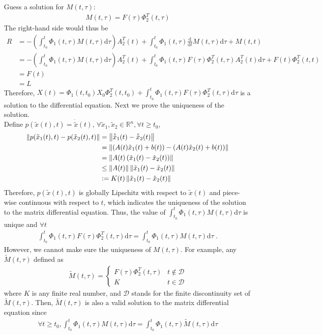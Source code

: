 \documentclass[a4paper,10.5pt]{article}
\newcommand{\de}{\mathrm{d}}
\newcommand{\R}{\mathbb{R}}
\newcommand{\defeq}{\vcentcolon=}
\newcommand{\norm}[1]{\left\lVert#1\right\rVert}
\begin{document}
Guess a solution for $M(t,\tau)$:
\begin{align*}
M(t,\tau) = F(\tau)\Phi_2^T(t,\tau)
\end{align*}
The right-hand side would thus be
\begin{align*}
R &= -\left( \int_{t_0}^{t}\Phi_1(t,\tau)M(t,\tau)\de\tau \right) A_2^T(t)+\int_{t_0}^t \Phi_1(t,\tau)\frac{\de}{\de t}M(t,\tau)\de \tau + M(t,t) \\
&= -\left( \int_{t_0}^{t}\Phi_1(t,\tau)M(t,\tau)\de\tau \right) A_2^T(t)+\int_{t_0}^t \Phi_1(t,\tau)F(\tau)\Phi_2^T(t,\tau)A_2^T(t)\de \tau + F(t)\Phi_2^T(t,t) \\
&= F(t) \\
&= L
\end{align*}
Therefore, $X(t) = \Phi_1(t,t_0) X_0 \Phi^T_2(t,t_0) + \int_{t_0}^{t}\Phi_1(t,\tau)F(\tau)\Phi_2^T(t,\tau)\mathrm{d}\tau$ is a solution to the differential equation. Next we prove the uniqueness of the solution. \\

Define $p(\tilde{x}(t),t) = \dot{\tilde{x}}(t)$, $\forall \tilde{x}_1,\tilde{x}_2 \in \R^n, \forall t \geq t_0$,
\begin{align*}
\norm{p(\tilde{x}_1(t),t)-p(\tilde{x}_2(t),t)} &= \norm{\dot{\tilde{x}}_1(t)-\dot{\tilde{x}}_2(t)} \\
&=\norm{\left(A(t)\tilde{x}_1(t)+b(t)\right)-\left(A(t)\tilde{x}_2(t)+b(t)\right)} \\
&=\norm{A(t)\left(\tilde{x}_1(t)-\tilde{x}_2(t)\right)} \\
&\leq\norm{A(t)}\norm{\tilde{x}_1(t)-\tilde{x}_2(t)}\\
&\defeq K(t)\norm{\tilde{x}_1(t)-\tilde{x}_2(t)}
\end{align*}
Therefore, $p(\tilde{x}(t),t)$ is globally Lipschitz with respect to $\tilde{x}(t)$ and piece-wise continuous with respect to $t$, which indicates the uniqueness of the solution to the matrix differential equation. Thus, the value of $\int_{t_0}^{t}\Phi_1(t,\tau)M(t,\tau)\de\tau$ is unique and $\forall t$
\begin{align*}
\int_{t_0}^{t}\Phi_1(t,\tau)F(\tau)\Phi_2^T(t,\tau)\mathrm{d}\tau = \int_{t_0}^{t}\Phi_1(t,\tau)M(t,\tau)\de\tau \; .
\end{align*}
However, we cannot make sure the uniqueness of $M(t,\tau)$. For example, any $\tilde{M}(t,\tau)$ defined as
\begin{align*}
\tilde{M}(t,\tau) = \begin{cases}
F(\tau)\Phi_2^T(t,\tau) & t \notin \mathcal{D} \\
K & t \in \mathcal{D}
\end{cases}
\end{align*}
where $K$ is any finite real number, and $\mathcal{D}$ stands for the finite discontinuity set of $\tilde{M}(t,\tau)$. Then, $\tilde{M}(t,\tau)$ is also a valid solution to the matrix differential equation since
\begin{align*}
\forall t \geq t_0, \int_{t_0}^{t}\Phi_1(t,\tau)M(t,\tau)\de\tau =  \int_{t_0}^{t}\Phi_1(t,\tau)\tilde{M}(t,\tau)\de\tau
\end{align*}
\end{document}
